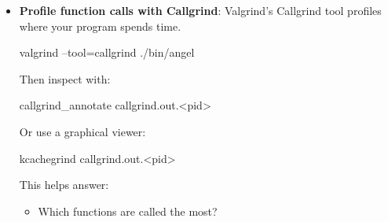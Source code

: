 \documentclass{report}
\begin{document}
\begin{itemize}
\begin{itemize}
                        \begin{bashcode}
                           valgrind --tool=massif ./bin
                        \end{bashcode}
                        \bigbreak \noindent 
                        Then inspect the output:
                        \bigbreak \noindent 
                        \begin{bashcode}
                        ms_print massif.out.<pid>
                        \end{bashcode}
                        \bigbreak \noindent 
                        This helps answer questions like:
                        \begin{itemize}
                            \item Where is my program using the most heap memory?
                            \item Which allocations dominate memory usage?
                            \item Does memory usage keep growing over time?
                        \end{itemize}
                    \item \textbf{Profile function calls with Callgrind}: Valgrind’s Callgrind tool profiles where your program spends time.
                        \bigbreak \noindent 
                        \begin{bashcode}
                        valgrind --tool=callgrind ./bin/angel
                        \end{bashcode}
                        \bigbreak \noindent 
                        Then inspect with:
                        \bigbreak \noindent 
                        \begin{bashcode}
                        callgrind_annotate callgrind.out.<pid>
                        \end{bashcode}
                        \bigbreak \noindent 
                        Or use a graphical viewer:
                        \bigbreak \noindent 
                        \begin{bashcode}
                        kcachegrind callgrind.out.<pid>
                        \end{bashcode}
                        \bigbreak \noindent 
                        This helps answer:
                        \begin{itemize}
                            \item Which functions are called the most?

\end{itemize}
\end{itemize}
\end{itemize}
\end{document}
